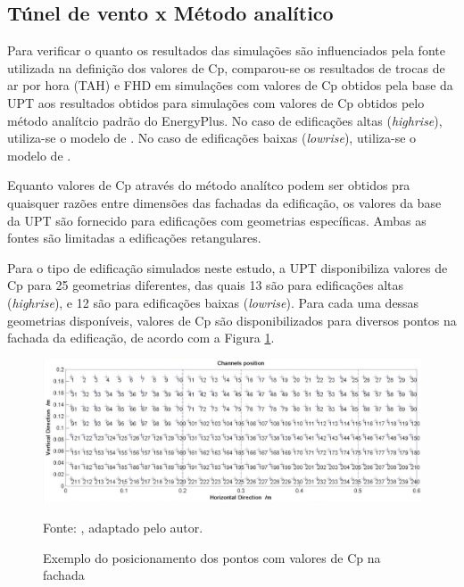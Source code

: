\documentclass[brazil,hardcopy,openany,a5paper]{ufscthesis}
\begin{document}
		
		\subsection{Túnel de vento x Método analítico}
		
		Para verificar o quanto os resultados das simulações são influenciados pela fonte utilizada na definição dos valores de Cp, comparou-se os resultados de trocas de ar por hora (TAH) e FHD em simulações com valores de Cp obtidos pela base da UPT aos resultados obtidos para simulações com valores de Cp obtidos pelo método analítcio padrão do EnergyPlus.
		No caso de edificações altas (\textit{highrise}), utiliza-se o modelo de  \cite{Atkins}. No caso de edificações baixas (\textit{lowrise}), utiliza-se o modelo de  \cite{SwamiChandra}.
		
		Equanto valores de Cp através do método analítco podem ser obtidos pra quaisquer razões entre dimensões das fachadas da edificação, os valores da base da UPT são fornecido para edificações com geometrias específicas. Ambas as fontes são limitadas a edificações retangulares.
		
		Para o tipo de edificação simulados neste estudo, a UPT disponibiliza valores de Cp para 25 geometrias diferentes, das quais 13 são para edificações altas (\textit{highrise}), e 12 são para edificações baixas (\textit{lowrise}). Para cada uma dessas geometrias disponíveis, valores de Cp são disponibilizados para diversos pontos na fachada da edificação, de acordo com a Figura \ref{fig:tpupoints}.
		
		\begin{figure}[h]
			\centering
			\caption{Exemplo do posicionamento dos pontos com valores de Cp na fachada}
			\includegraphics[width=1\linewidth]{img/tpu_points.png}
			\label{fig:tpupoints}
			\begin{flushleft}
				Fonte:  \cite{TPU2018}, adaptado pelo autor.
			\end{flushleft}
		\end{figure}
		
\end{document}

